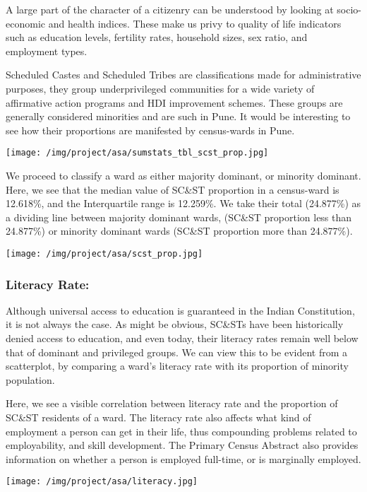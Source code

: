 \documentclass[
]{article}
\begin{document}
A large part of the character of a citizenry can be understood by
looking at socio-economic and health indices. These make us privy to
quality of life indicators such as education levels, fertility rates,
household sizes, sex ratio, and employment types.

Scheduled Castes and Scheduled Tribes are classifications made for
administrative purposes, they group underprivileged communities for a
wide variety of affirmative action programs and HDI improvement schemes.
These groups are generally considered minorities and are such in Pune.
It would be interesting to see how their proportions are manifested by
census-wards in Pune.

\texttt{[image: /img/project/asa/sumstats\_tbl\_scst\_prop.jpg]}

We proceed to classify a ward as either majority dominant, or minority
dominant. Here, we see that the median value of SC\&ST proportion in a
census-ward is 12.618\%, and the Interquartile range is 12.259\%. We
take their total (24.877\%) as a dividing line between majority dominant
wards, (SC\&ST proportion less than 24.877\%) or minority dominant wards
(SC\&ST proportion more than 24.877\%).

\texttt{[image: /img/project/asa/scst\_prop.jpg]}

\hypertarget{literacy-rate}{%
\subsubsection{Literacy Rate:}\label{literacy-rate}}

Although universal access to education is guaranteed in the Indian
Constitution, it is not always the case. As might be obvious, SC\&STs
have been historically denied access to education, and even today, their
literacy rates remain well below that of dominant and privileged groups.
We can view this to be evident from a scatterplot, by comparing a ward's
literacy rate with its proportion of minority population.

Here, we see a visible correlation between literacy rate and the
proportion of SC\&ST residents of a ward. The literacy rate also affects
what kind of employment a person can get in their life, thus compounding
problems related to employability, and skill development. The Primary
Census Abstract also provides information on whether a person is
employed full-time, or is marginally employed.

\texttt{[image: /img/project/asa/literacy.jpg]}
\end{document}
